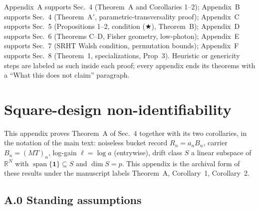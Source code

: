 
Appendix~A supports Sec.~4 (Theorem~A and Corollaries 1--2); Appendix~B supports Sec.~4 (Theorem~A$'$, parametric-transversality proof); Appendix~C supports Sec.~5 (Propositions 1--2, condition ($\bigstar$), Theorem~B); Appendix~D supports Sec.~6 (Theorems C--D, Fisher geometry, low-photon); Appendix~E supports Sec.~7 (SRHT Walsh condition, permutation bounds); Appendix~F supports Sec.~8 (Theorem~1, specializations, Prop~3). Heuristic or genericity steps are labeled as such inside each proof; every appendix ends its theorems with a ``What this does not claim'' paragraph.

\section{Square-design non-identifiability}

This appendix proves Theorem~A of Sec.~4 together with its two corollaries, in the notation of the main text: noiseless bucket record $R_n = a_n B_n$, carrier $B_n = (MT)_n$, log-gain $\ell = \log a$ (entrywise), drift class $S$ a linear subspace of $\mathbb{R}^N$ with $\operatorname{span}\{\mathbf 1\}\subseteq S$ and $\dim S = p$. This appendix is the archival form of these results under the manuscript labels Theorem~A, Corollary~1, Corollary~2.

\subsection{A.0 Standing assumptions}

